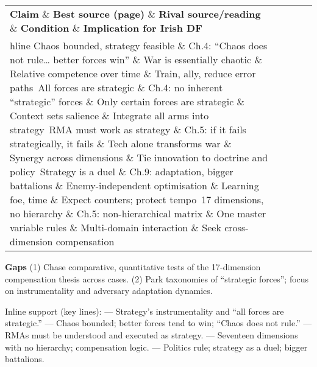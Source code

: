  
\begin{tabular}{p{3.2cm}p{4.2cm}p{3.6cm}p{3.2cm}p{4.2cm}}
	\textbf{Claim} \& \textbf{Best source (page)} \& \textbf{Rival source/reading} \& \textbf{Condition} \& \textbf{Implication for Irish DF}\\hline
	Chaos bounded, strategy feasible \& Ch.4: “Chaos does not rule… better forces win” \& War is essentially chaotic \& Relative competence over time \& Train, ally, reduce error paths\
	All forces are strategic \& Ch.4: no inherent “strategic” forces \& Only certain forces are strategic \& Context sets salience \& Integrate all arms into strategy\
	RMA must work as strategy \& Ch.5: if it fails strategically, it fails \& Tech alone transforms war \& Synergy across dimensions \& Tie innovation to doctrine and policy\
	Strategy is a duel \& Ch.9: adaptation, bigger battalions \& Enemy-independent optimisation \& Learning foe, time \& Expect counters; protect tempo\
	17 dimensions, no hierarchy \& Ch.5: non-hierarchical matrix \& One master variable rules \& Multi-domain interaction \& Seek cross-dimension compensation\
\end{tabular}

\textbf{Gaps}
(1) Chase comparative, quantitative tests of the 17-dimension compensation thesis across cases.
(2) Park taxonomies of “strategic forces”; focus on instrumentality and adversary adaptation dynamics.

Inline support (key lines):
— Strategy’s instrumentality and “all forces are strategic.”
— Chaos bounded; better forces tend to win; “Chaos does not rule.”
— RMAs must be understood and executed as strategy.
— Seventeen dimensions with no hierarchy; compensation logic.
— Politics rule; strategy as a duel; bigger battalions.

\parencite{GRAY_2005}

